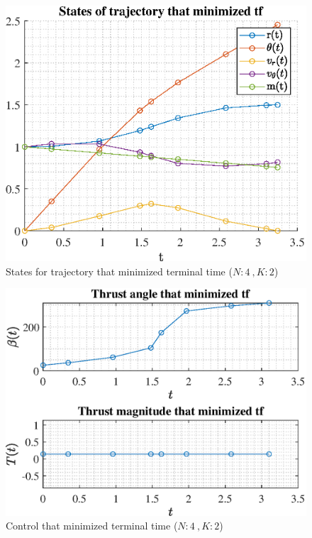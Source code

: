 \documentclass[]{article}
\begin{document}
	\begin{figure}
		\centering
		\includegraphics[scale=0.75]{states_N4_K2_C3_tf.eps}
		\caption{States for trajectory that minimized terminal time (\(N:4\ , K:2\))}
		\label{fig:states_N4_K2_C3_tf}
	\end{figure}
	\begin{figure}
		\centering
		\includegraphics[scale=0.75]{control_N4_K2_C3_tf.eps}
		\caption{Control that minimized terminal time (\(N:4\ , K:2\))}
		\label{fig:control_N4_K2_C3_tf}
	\end{figure}
\end{document}
